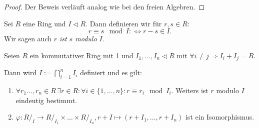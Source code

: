\begin{proof}
    Der Beweis verläuft analog wie bei den freien Algebren.
\end{proof}


\begin{definition}
    Sei $R$ eine Ring und $I\vartriangleleft R$. Dann definieren wir für $r,s\in R$:
    $$r\equiv s\mod I:\Leftrightarrow r-s\in I.$$
    Wir sagen auch \emph{$r$ ist $s$ modulo $I$}.
\end{definition}

\begin{theorem}
    Seien $R$ ein kommutativer Ring mit 1 und $I_1,\ldots,I_n\vartriangleleft R$ mit $\forall i\neq j\Rightarrow I_i+I_j=R$.
    
    Dann wird $I:=\bigcap_{i=1}^nI_i$ definiert und es gilt:
    \begin{enumerate}
        \item $\forall r_1\ldots,r_n\in R\,\exists r\in R:\forall i\in\{1,\ldots,n\}:r\equiv r_i\mod I_i$. Weiters ist $r$
        modulo $I$ eindeutig bestimmt.
        \item $\varphi:R/_I\to R/_{I_1}\times\ldots\times R/_{I_n}, r+I\mapsto (r+I_1,\ldots,r+I_n)$ ist ein Isomorphismus.
    \end{enumerate}
\end{theorem}

